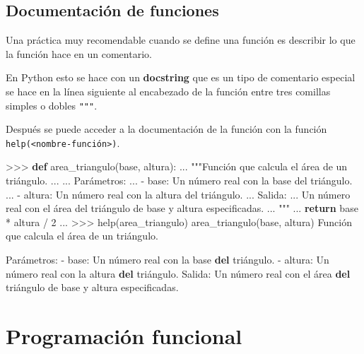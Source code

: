\documentclass[
  spanish,
  a4paper,
]{scrreport}
\newenvironment{Shaded}{\begin{snugshade}}{\end{snugshade}}
\newcommand{\BuiltInTok}[1]{\textcolor[rgb]{0.00,0.23,0.31}{#1}}
\newcommand{\ControlFlowTok}[1]{\textcolor[rgb]{0.00,0.23,0.31}{\textbf{#1}}}
\newcommand{\DecValTok}[1]{\textcolor[rgb]{0.68,0.00,0.00}{#1}}
\newcommand{\KeywordTok}[1]{\textcolor[rgb]{0.00,0.23,0.31}{\textbf{#1}}}
\newcommand{\NormalTok}[1]{\textcolor[rgb]{0.00,0.23,0.31}{#1}}
\newcommand{\OperatorTok}[1]{\textcolor[rgb]{0.37,0.37,0.37}{#1}}
\newcommand{\StringTok}[1]{\textcolor[rgb]{0.13,0.47,0.30}{#1}}
\begin{document}
\section{Documentación de
funciones}\label{documentaciuxf3n-de-funciones}

Una práctica muy recomendable cuando se define una función es describir
lo que la función hace en un comentario.

En Python esto se hace con un \textbf{docstring} que es un tipo de
comentario especial se hace en la línea siguiente al encabezado de la
función entre tres comillas simples
\texttt{\textquotesingle{}\textquotesingle{}\textquotesingle{}} o dobles
\texttt{"""}.

Después se puede acceder a la documentación de la función con la función
\texttt{help(\textless{}nombre-función\textgreater{})}.

\begin{Shaded}
\begin{Highlighting}[]
\OperatorTok{\textgreater{}\textgreater{}\textgreater{}} \KeywordTok{def}\NormalTok{ area\_triangulo(base, altura):}
\NormalTok{... }\StringTok{"""Función que calcula el área de un triángulo.}
\StringTok{...}
\StringTok{... Parámetros:}
\StringTok{...     {-} base: Un número real con la base del triángulo.}
\StringTok{...     {-} altura: Un número real con la altura del triángulo.}
\StringTok{... Salida:}
\StringTok{...     Un número real con el área del triángulo de base y altura especificadas.}
\StringTok{... """}
\NormalTok{...     }\ControlFlowTok{return}\NormalTok{ base }\OperatorTok{*}\NormalTok{ altura }\OperatorTok{/} \DecValTok{2}
\NormalTok{...}
\OperatorTok{\textgreater{}\textgreater{}\textgreater{}} \BuiltInTok{help}\NormalTok{(area\_triangulo)}
\NormalTok{area\_triangulo(base, altura)}
\NormalTok{    Función que calcula el área de un triángulo.}

\NormalTok{    Parámetros:}
        \OperatorTok{{-}}\NormalTok{ base: Un número real con la base }\KeywordTok{del}\NormalTok{ triángulo.}
        \OperatorTok{{-}}\NormalTok{ altura: Un número real con la altura }\KeywordTok{del}\NormalTok{ triángulo.}
\NormalTok{    Salida:}
\NormalTok{        Un número real con el área }\KeywordTok{del}\NormalTok{ triángulo de base y altura especificadas.}
\end{Highlighting}
\end{Shaded}


\chapter{Programación funcional}\label{programaciuxf3n-funcional}
\end{document}
